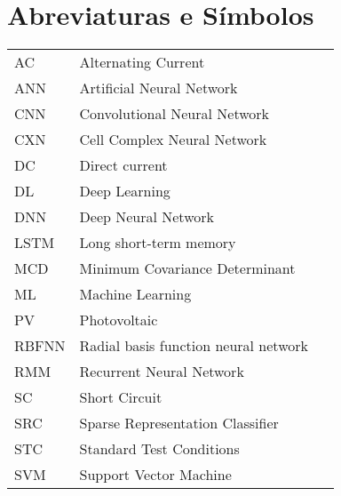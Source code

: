 \chapter*{Abreviaturas e Símbolos}

\begin{flushleft}
\begin{tabular}{l p{0.8\linewidth}}
AC         & Alternating Current \\
ANN        & Artificial Neural Network \\
CNN        & Convolutional Neural Network \\
CXN       & Cell Complex Neural Network \\
DC      & Direct current \\
DL      & Deep Learning \\
DNN      & Deep Neural Network \\
LSTM      & Long short-term memory \\
MCD      & Minimum Covariance Determinant\\
ML          & Machine Learning \\
PV      & Photovoltaic \\
RBFNN   & Radial basis function neural network \\
RMM     & Recurrent Neural Network \\
SC      & Short Circuit \\
SRC     & Sparse Representation Classifier \\
STC      & Standard Test Conditions \\
SVM         & Support Vector Machine
\end{tabular}
\end{flushleft}

